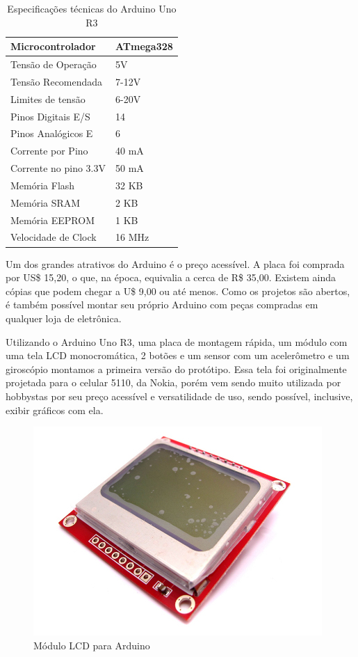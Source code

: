 \documentclass[a4paper,12pt]{article}
\begin{document}
\begin{table}[H]
\centering
\begin{tabular}{ll}
Microcontrolador	& ATmega328 \\
\hline
Tensão de Operação	& 5V \\
\hline
Tensão Recomendada	& 7-12V \\
\hline
Limites de tensão	& 6-20V \\
\hline
Pinos Digitais E/S	& 14 \\
\hline
Pinos Analógicos E	& 6 \\
\hline
Corrente por Pino& 40 mA \\
\hline
Corrente no pino 3.3V & 50 mA \\
\hline
Memória Flash		& 32 KB \\
\hline
Memória SRAM		& 2 KB \\
\hline
Memória EEPROM		& 1 KB\\
\hline
Velocidade de Clock	& 16 MHz\\
\end{tabular}
\caption{Especificações técnicas do Arduino Uno R3}
\label{espec}
\end{table}

Um dos grandes atrativos do Arduino é o preço acessível. A placa foi comprada por US\$ 15,20, o que, na época, equivalia a cerca de R\$ 35,00. Existem ainda cópias que podem chegar a U\$ 9,00 ou até menos. Como os projetos são abertos, é também possível montar seu próprio Arduino com peças compradas em qualquer loja de eletrônica.

Utilizando o Arduino Uno R3, uma placa de montagem rápida, um módulo com uma tela LCD monocromática, 2 botões e um sensor com um acelerômetro e um giroscópio montamos a primeira versão do protótipo. Essa tela foi originalmente projetada para o celular 5110, da Nokia, porém vem sendo muito utilizada por hobbystas por seu preço acessível e versatilidade de uso, sendo possível, inclusive, exibir gráficos com ela.

\begin{figure}[H]
\centering
\includegraphics[width=.4\textwidth]{img/tela.jpg}
\caption{Módulo LCD para Arduino}
\end{figure}
\end{document}
